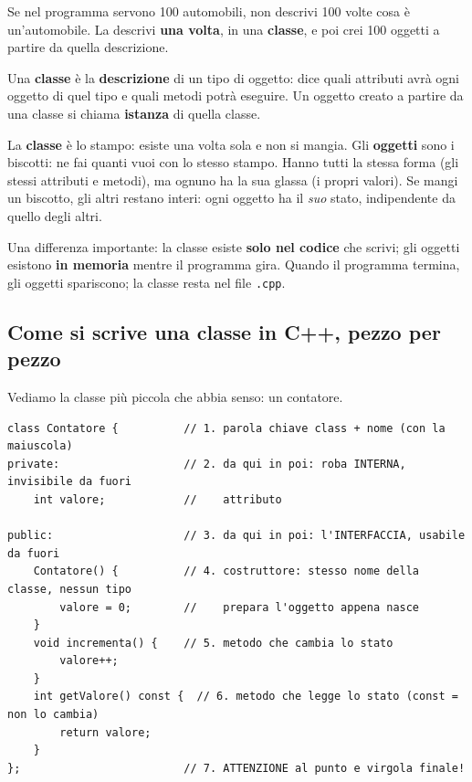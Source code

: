 Se nel programma servono 100 automobili, non descrivi 100 volte cosa è
un'automobile. La descrivi \textbf{una volta}, in una \textbf{classe}, e poi
crei 100 oggetti a partire da quella descrizione.

\begin{definizione}[: classe]
Una \textbf{classe} è la \textbf{descrizione} di un tipo di oggetto: dice quali
attributi avrà ogni oggetto di quel tipo e quali metodi potrà eseguire.
Un oggetto creato a partire da una classe si chiama \textbf{istanza} di quella classe.
\end{definizione}

\begin{analogia}
La \textbf{classe} è lo stampo: esiste una volta sola e non si mangia.
Gli \textbf{oggetti} sono i biscotti: ne fai quanti vuoi con lo stesso stampo.
Hanno tutti la stessa forma (gli stessi attributi e metodi), ma ognuno ha la sua
glassa (i propri valori). Se mangi un biscotto, gli altri restano interi:
ogni oggetto ha il \emph{suo} stato, indipendente da quello degli altri.
\end{analogia}

Una differenza importante: la classe esiste \textbf{solo nel codice} che
scrivi; gli oggetti esistono \textbf{in memoria} mentre il programma gira.
Quando il programma termina, gli oggetti spariscono; la classe resta nel file
\texttt{.cpp}.

\subsection*{Come si scrive una classe in C++, pezzo per pezzo}

Vediamo la classe più piccola che abbia senso: un contatore.

\begin{lstlisting}
class Contatore {          // 1. parola chiave class + nome (con la maiuscola)
private:                   // 2. da qui in poi: roba INTERNA, invisibile da fuori
    int valore;            //    attributo

public:                    // 3. da qui in poi: l'INTERFACCIA, usabile da fuori
    Contatore() {          // 4. costruttore: stesso nome della classe, nessun tipo
        valore = 0;        //    prepara l'oggetto appena nasce
    }
    void incrementa() {    // 5. metodo che cambia lo stato
        valore++;
    }
    int getValore() const {  // 6. metodo che legge lo stato (const = non lo cambia)
        return valore;
    }
};                         // 7. ATTENZIONE al punto e virgola finale!
\end{lstlisting}


